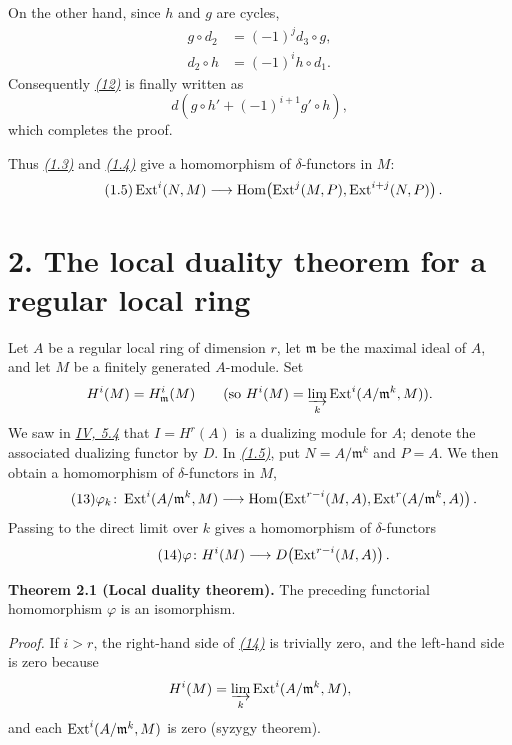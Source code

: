 On the other hand, since $h$ and $g$ are cycles,
\begin{align*}
  g\circ d_2&=(-1)^j d_3\circ g,\\
  d_2\circ h&=(-1)^i h\circ d_1.
\end{align*}
Consequently \emph{\hyperref[eq:V.12]{(12)}} is finally written as
\[
  d\!\left(g\circ h'+(-1)^{i+1}g'\circ h\right),
\]
which completes the proof.

Thus \emph{\hyperref[eq:V.1.3]{(1.3)}} and \emph{\hyperref[eq:V.1.4]{(1.4)}} give a homomorphism of $\delta$-functors
in $M$:
\begin{equation*}\tag{1.5}\label{eq:V.1.5}
  \operatorname{Ext}^i(N,M)\longrightarrow
  \operatorname{Hom}\!\left(\operatorname{Ext}^j(M,P),\operatorname{Ext}^{i+j}(N,P)\right).
\end{equation*}

\section*{2. The local duality theorem for a regular local ring}

Let $A$ be a regular local ring of dimension $r$, let $\mathfrak m$ be the
maximal ideal of $A$, and let $M$ be a finitely generated $A$-module. Set
\[
  H^i(M)=H^i_{\mathfrak m}(M)
  \qquad\text{(so }H^i(M)=\varinjlim_k
    \operatorname{Ext}^i(A/\mathfrak m^k,M)\text{)}.
\]
We saw in \emph{\hyperref[IV.5.4]{IV, 5.4}} that $I=H^r(A)$ is a dualizing module for $A$;
denote the associated dualizing functor by $D$. In \emph{\hyperref[eq:V.1.5]{(1.5)}}, put
$N=A/\mathfrak m^k$ and $P=A$. We then obtain a homomorphism of
$\delta$-functors in $M$,
\begin{equation}\tag{13}\label{eq:V.13}
  \varphi_k\colon \operatorname{Ext}^i(A/\mathfrak m^k,M)
  \longrightarrow
  \operatorname{Hom}\!\left(\operatorname{Ext}^{r-i}(M,A),
    \operatorname{Ext}^r(A/\mathfrak m^k,A)\right).
\end{equation}
Passing to the direct limit over $k$ gives a homomorphism of
$\delta$-functors
\begin{equation}\tag{14}\label{eq:V.14}
  \varphi\colon H^i(M)\longrightarrow
    D\!\left(\operatorname{Ext}^{r-i}(M,A)\right).
\end{equation}

\medskip
\noindent\textbf{Theorem 2.1 (Local duality theorem).}
The preceding functorial homomorphism $\varphi$ is an isomorphism.

\medskip
\noindent\textit{Proof.}
If $i>r$, the right-hand side of \emph{\hyperref[eq:V.14]{(14)}} is trivially zero,
and the left-hand side is zero because
\[
  H^i(M)=\varinjlim_k \operatorname{Ext}^i(A/\mathfrak m^k,M),
\]
and each $\operatorname{Ext}^i(A/\mathfrak m^k,M)$ is zero (syzygy theorem).

